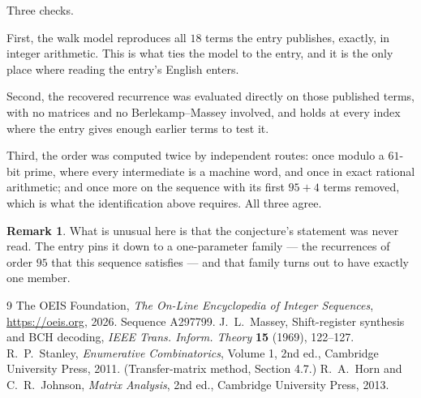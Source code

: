 \documentclass[11pt,a4paper]{article}
\theoremstyle{plain}
\theoremstyle{definition}
\newtheorem{remark}[theorem]{Remark}
\begin{document}
Three checks.

First, the walk model reproduces all $18$ terms the entry publishes, exactly, in integer
arithmetic. This is what ties the model to the entry, and it is the only place where reading
the entry's English enters.

Second, the recovered recurrence was evaluated directly on those published terms, with no
matrices and no Berlekamp--Massey involved, and holds at every index where the entry gives
enough earlier terms to test it.

Third, the order was computed twice by independent routes: once modulo a $61$-bit prime, where
every intermediate is a machine word, and once in exact rational arithmetic; and once more on
the sequence with its first $95+4$ terms removed, which is what the identification above
requires. All three agree.

\begin{remark}
What is unusual here is that the conjecture's statement was never read. The entry pins it down
to a one-parameter family --- the recurrences of order $95$ that this sequence satisfies
--- and that family turns out to have exactly one member.
\end{remark}

\begin{thebibliography}{9}
 The OEIS Foundation, \emph{The On-Line Encyclopedia of Integer
Sequences}, \url{https://oeis.org}, 2026. Sequence A297799.
 J.~L.~Massey, Shift-register synthesis and BCH decoding, \emph{IEEE
Trans. Inform. Theory} \textbf{15} (1969), 122--127.
 R.~P.~Stanley, \emph{Enumerative Combinatorics}, Volume 1, 2nd ed.,
Cambridge University Press, 2011. (Transfer-matrix method, Section 4.7.)
 R.~A.~Horn and C.~R.~Johnson, \emph{Matrix Analysis}, 2nd ed., Cambridge
University Press, 2013.
\end{thebibliography}
\end{document}
